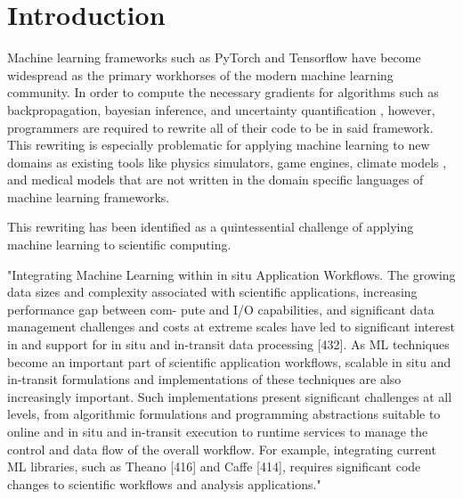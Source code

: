 \section{Introduction}
\label{sec:intro}

Machine learning frameworks such as PyTorch\cite{paszke2017automatic} and Tensorflow\cite{abadi2016tensorflow} have become widespread as the primary workhorses of the modern machine learning community. In order to compute the necessary gradients for algorithms such as backpropagation\cite{hecht1992theory}, bayesian inference, and uncertainty quantification \cite{Wang2018-yr}, however, programmers are required to rewrite all of their code to be in said framework. This rewriting is especially problematic for applying machine learning to new domains as existing tools like physics simulators\cite{feng2016fastpm, broughton2020tensorflow, NIPS2018_7948, degrave2019differentiable, hu2019difftaichi}, game engines, climate models \cite{Stevens2020-ir}, and medical models\cite{alquraishi2019end} that are not written in the domain specific languages of machine learning frameworks. 

This rewriting has been identified as a quintessential challenge of applying machine learning to scientific computing.

"Integrating Machine Learning within in situ Application Workflows. The growing data sizes
and complexity associated with scientific applications, increasing performance gap between com-
pute and I/O capabilities, and significant data management challenges and costs at extreme scales
have led to significant interest in and support for in situ and in-transit data processing [432]. As
ML techniques become an important part of scientific application workflows, scalable in situ and
in-transit formulations and implementations of these techniques are also increasingly important.
Such implementations present significant challenges at all levels, from algorithmic formulations
and programming abstractions suitable to online and in situ and in-transit execution to runtime
services to manage the control and data flow of the overall workflow. For example, integrating
current ML libraries, such as Theano [416] and Caffe [414], requires significant code changes to
scientific workflows and analysis applications." \cite{Baker2019-ty}




